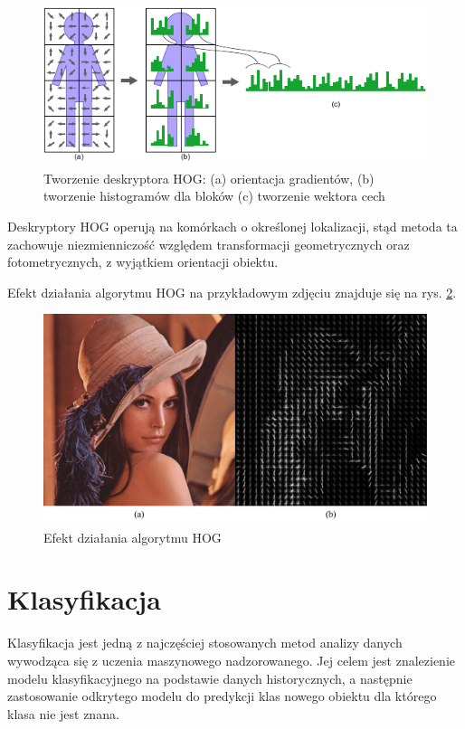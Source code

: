 \begin{figure}[h]
	\centering
	\includegraphics[scale=1.7]{graphics/01_podstawy_teoretyczne/hog-process.pdf}
	\caption{ Tworzenie deskryptora HOG: (a) orientacja gradientów, (b) tworzenie histogramów dla bloków (c) tworzenie wektora cech }
	\label{fig:hog-process}
\end{figure}

Deskryptory HOG operują na komórkach o określonej lokalizacji, stąd metoda ta zachowuje niezmienniczość względem transformacji geometrycznych oraz fotometrycznych, z wyjątkiem orientacji obiektu.\cite{DALAL05}

Efekt działania algorytmu HOG na przykładowym zdjęciu znajduje się na rys. \ref{fig:hog-features}.

\begin{figure}[h]
	\centering
	\includegraphics[scale=0.5]{graphics/01_podstawy_teoretyczne/hog-features.pdf}
	\caption{ Efekt działania algorytmu HOG }
	\label{fig:hog-features}
\end{figure}

\section{Klasyfikacja}
Klasyfikacja jest jedną z najczęściej stosowanych metod analizy danych wywodząca się z uczenia maszynowego nadzorowanego. Jej celem jest znalezienie modelu klasyfikacyjnego na podstawie danych historycznych, a następnie zastosowanie odkrytego modelu do predykcji klas nowego obiektu dla którego klasa nie jest znana.

